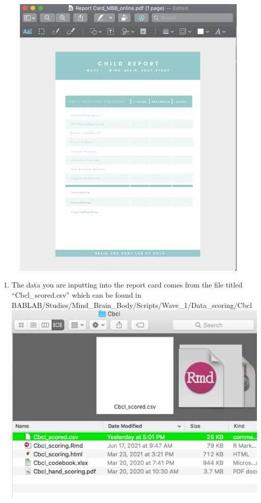 \documentclass[]{book}
\providecommand{\tightlist}{%
  \setlength{\itemsep}{0pt}\setlength{\parskip}{0pt}}
\begin{document}
\begin{figure}
\centering
\includegraphics{images/report_card_online/3.png}
\caption{}
\end{figure}

\begin{enumerate}
\def\labelenumi{\arabic{enumi}.}
\setcounter{enumi}{3}
\tightlist
\item
  The data you are inputting into the report card comes from the file titled ``Cbcl\_scored.csv'' which can be found in BABLAB/Studies/Mind\_Brain\_Body/Scripts/Wave\_1/Data\_scoring/Cbcl
  \includegraphics{images/report_card_online/10.png}
\end{enumerate}
\end{document}
